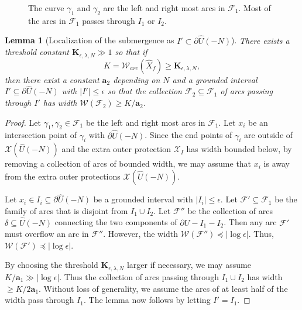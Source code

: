 \documentclass[11pt, reqno]{amsart}
\newcommand{\incfig}[1]{%
    \def\svgwidth{\columnwidth}
    {#1.pdf_tex}
}
\numberwithin{equation}{section}
\theoremstyle{plain}
\theoremstyle{theorem}
\newtheorem{lem}[theorem]{Lemma}
\theoremstyle{plain}
\theoremstyle{definition}
\numberwithin{figure}{section}
\newcommand\XX{\mathcal{X}}
\begin{document}
\begin{figure}[ht]
  \centering
  \resizebox{\linewidth}{!}{
  \incfig{LT}
  }
  \caption{The curve $\gamma_1$ and $\gamma_2$ are the left and right most arcs in $\mathcal{F}_1$. Most of the arcs in $\mathcal{F}_1$ passes through $I_1$ or $I_2$.}
  \label{fig:LT}
\end{figure}

\begin{lem}[Localization of the submergence as $I'\subset \partial \widehat U(-N)$]
\label{lem:4.4}
There exists a threshold constant $\mathbf{K}_{\epsilon,\lambda, N} \gg 1$ so that if 
$$
K = \mathcal{W}_{arc}(\widehat X_f) \geq \mathbf{K}_{\epsilon,\lambda, N},
$$ 
then
there exist a constant $\mathbf{a}_2$ depending on $N$ and a grounded interval $I' \subseteq \partial \widehat U(-{N})$ with $\vert I' \vert \leq \epsilon$ so that the collection $\mathcal{F}_2 \subseteq \mathcal{F}_1$ of arcs passing through $I'$ has width $\mathcal{W}(\mathcal{F}_2) \geq K/ \mathbf{a}_2$.
\end{lem}
\begin{proof}
Let $\gamma_1, \gamma_2 \in \mathcal{F}_1$ be the left and right most arcs in $\mathcal{F}_1$.
Let $x_i$ be an intersection point of $\gamma_i$ with $\partial \widehat U(-{N})$.
Since the end points of $\gamma_i$ are outside of $\XX(\widehat U(-{N}))$ and the extra outer protection $\XX_I$ has width bounded below, by removing a collection of arcs of bounded width, we may assume that $x_i$ is away from the extra outer protections $\XX(\widehat U(-{N}))$.

Let $x_i \in I_i \subseteq \partial \widehat U(-{N})$ be a grounded interval with $\vert I_i \vert \leq \epsilon$.
Let $\mathcal{F}' \subseteq \mathcal{F}_1$ be the family of arcs that is disjoint from $I_1 \cup I_2$.
Let $\mathcal{F}''$ be the collection of arcs $\delta \subseteq \widehat U(-{N})$ connecting the two components of $\partial U - I_1 - I_2$.
Then any arc $\mathcal{F}'$ must overflow an arc in $\mathcal{F}''$.
However, the width $\mathcal{W}(\mathcal{F}'') \preceq \vert \log \epsilon \vert$.
Thus, $\mathcal{W}(\mathcal{F}') \preceq \vert \log \epsilon \vert$.

By choosing the threshold $\mathbf{K}_{\epsilon,\lambda, N}$ larger if necessary, we may assume $K/ \mathbf{a}_1 \gg \vert \log \epsilon \vert$.
Thus the collection of arcs passing through $I_1 \cup I_2$ has width $\geq K/ 2\mathbf{a}_1$.
Without loss of generality, we assume the arcs of at least half of the width pass through $I_1$.
The lemma now follows by letting $I' = I_1$.
\end{proof}
\end{document}
